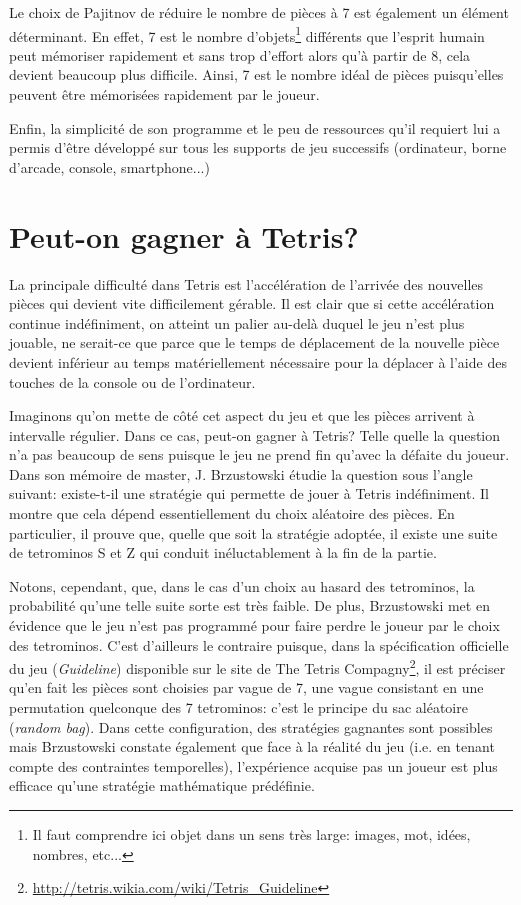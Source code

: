 Le choix de Pajitnov de réduire le nombre de pièces à 7 est également un élément déterminant. En effet, 7 est le nombre d'\og objets\footnote{Il faut comprendre ici objet dans un sens très large: images, mot, idées, nombres, etc...} \fg{} différents que l'esprit humain peut mémoriser rapidement et sans trop d'effort alors qu'à partir de 8, cela devient beaucoup plus difficile. Ainsi, 7 est le nombre idéal de pièces puisqu'elles peuvent être mémorisées rapidement par le joueur. 

Enfin, la simplicité de son programme et le peu de ressources qu'il requiert lui a permis d'être développé sur tous les supports de jeu successifs (ordinateur, borne d'arcade, console, smartphone...) 

\section{Peut-on gagner à Tetris?}
La principale difficulté dans Tetris est l'accélération de l'arrivée des nouvelles pièces qui devient vite difficilement gérable. Il est clair que si cette accélération continue indéfiniment, on atteint un palier au-delà duquel le jeu n'est plus jouable, ne serait-ce que parce que le temps de déplacement de la nouvelle pièce devient inférieur au temps matériellement nécessaire pour la déplacer à l'aide des touches de la console ou de l'ordinateur. 

Imaginons qu'on mette de côté cet aspect du jeu et que les pièces arrivent à intervalle régulier. Dans ce cas, peut-on gagner à Tetris? Telle quelle la question n'a pas beaucoup de sens puisque le jeu ne prend fin qu'avec la défaite du joueur. Dans son mémoire de master, J. Brzustowski étudie la question sous l'angle suivant: existe-t-il une stratégie qui permette de jouer à Tetris indéfiniment. Il montre que cela dépend essentiellement du choix aléatoire des pièces. En particulier, il prouve que, quelle que soit la stratégie adoptée, il existe une suite de tetrominos S et Z qui conduit inéluctablement à la fin de la partie. 

Notons, cependant, que, dans le cas d'un choix au hasard des tetrominos, la probabilité qu'une telle suite sorte est très faible. De plus, Brzustowski met en évidence que le jeu n'est pas programmé pour faire perdre le joueur par le choix des tetrominos. C'est d'ailleurs le contraire puisque, dans la spécification officielle du jeu (\textit{Guideline}) disponible sur le site de The Tetris Compagny\footnote{\url{http://tetris.wikia.com/wiki/Tetris_Guideline}}, il est préciser qu'en fait les pièces sont choisies par vague de 7, une vague consistant en une permutation quelconque des 7 tetrominos: c'est le principe du \og sac aléatoire \fg{} (\textit{random bag}). Dans cette configuration, des stratégies gagnantes sont possibles mais Brzustowski constate également que face à la réalité du jeu (i.e. en tenant compte des contraintes temporelles), l'expérience acquise pas un joueur est plus efficace qu'une stratégie mathématique prédéfinie.




